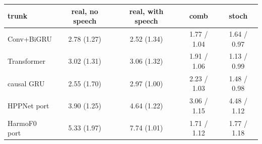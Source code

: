 \begin{tabular}{@{}lcccc@{}}
\toprule
trunk & real, no speech & real, with speech & comb & stoch \\
\midrule
Conv+BiGRU & 2.78 (1.27) & 2.52 (1.34) & 1.77 / 1.04 & 1.64 / 0.97 \\
Transformer & 3.02 (1.31) & 3.06 (1.32) & 1.91 / 1.06 & 1.13 / 0.99 \\
causal GRU & 2.55 (1.70) & 2.97 (1.00) & 2.23 / 1.03 & 1.48 / 0.98 \\
HPPNet port & 3.90 (1.25) & 4.64 (1.22) & 3.06 / 1.15 & 4.48 / 1.12 \\
HarmoF0 port & 5.33 (1.97) & 7.74 (1.01) & 1.71 / 1.12 & 1.77 / 1.18 \\
\bottomrule
\end{tabular}
